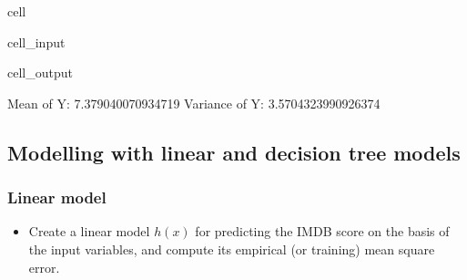 \documentclass[letterpaper,10pt,english]{jupyterBook}
\begin{document}
\begin{sphinxuseclass}{cell}
\begin{sphinxVerbatimInput}
\begin{sphinxuseclass}{cell_input}
\end{sphinxuseclass}\end{sphinxVerbatimInput}
\begin{sphinxVerbatimOutput}

\begin{sphinxuseclass}{cell_output}
\noindent{}

\begin{sphinxVerbatim}[commandchars=\\\{\}]
Mean of Y: \PYGZhy{}7.379040070934719
Variance of Y: 3.5704323990926374
\end{sphinxVerbatim}

\end{sphinxuseclass}\end{sphinxVerbatimOutput}

\end{sphinxuseclass}

\subsection{Modelling with linear and decision tree models}
\label{\detokenize{05:modelling-with-linear-and-decision-tree-models}}

\subsubsection{Linear model}
\label{\detokenize{05:linear-model}}\begin{itemize}
\item {} 
\sphinxAtStartPar
Create a linear model \(h(x)\) for predicting the IMDB score on the basis of the input variables, and compute its empirical (or training) mean square error.

\end{itemize}
\end{document}
